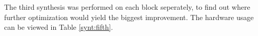 
The third synthesis was performed on each block seperately, to find 
out where further optimization would yield the biggest improvement. 
The hardware usage can be viewed in Table \ref{synt:fifth}.

%
\newcommand{\MyIndent}{\hspace*{0.2cm}}%

